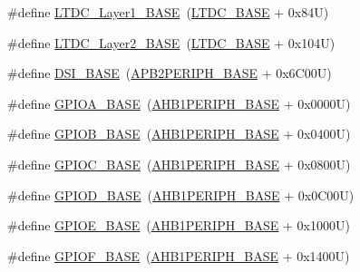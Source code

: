 \begin{DoxyCompactItemize}
\item 
\#define \hyperlink{group___peripheral__memory__map_ga81a2641d0a8e698f32b160b2d20d070b}{L\+T\+D\+C\+\_\+\+Layer1\+\_\+\+B\+A\+SE}~(\hyperlink{group___peripheral__memory__map_gac6e45c39fafa3e82cdedbf447b461704}{L\+T\+D\+C\+\_\+\+B\+A\+SE} + 0x84\+U)
\item 
\#define \hyperlink{group___peripheral__memory__map_ga696614b764a3820d9f9560a0eec1e111}{L\+T\+D\+C\+\_\+\+Layer2\+\_\+\+B\+A\+SE}~(\hyperlink{group___peripheral__memory__map_gac6e45c39fafa3e82cdedbf447b461704}{L\+T\+D\+C\+\_\+\+B\+A\+SE} + 0x104\+U)
\item 
\#define \hyperlink{group___peripheral__memory__map_gac094188b138a77bbac13d9361609b617}{D\+S\+I\+\_\+\+B\+A\+SE}~(\hyperlink{group___peripheral__memory__map_ga25b99d6065f1c8f751e78f43ade652cb}{A\+P\+B2\+P\+E\+R\+I\+P\+H\+\_\+\+B\+A\+SE} + 0x6\+C00\+U)
\item 
\#define \hyperlink{group___peripheral__memory__map_gad7723846cc5db8e43a44d78cf21f6efa}{G\+P\+I\+O\+A\+\_\+\+B\+A\+SE}~(\hyperlink{group___peripheral__memory__map_ga811a9a4ca17f0a50354a9169541d56c4}{A\+H\+B1\+P\+E\+R\+I\+P\+H\+\_\+\+B\+A\+SE} + 0x0000\+U)
\item 
\#define \hyperlink{group___peripheral__memory__map_gac944a89eb789000ece920c0f89cb6a68}{G\+P\+I\+O\+B\+\_\+\+B\+A\+SE}~(\hyperlink{group___peripheral__memory__map_ga811a9a4ca17f0a50354a9169541d56c4}{A\+H\+B1\+P\+E\+R\+I\+P\+H\+\_\+\+B\+A\+SE} + 0x0400\+U)
\item 
\#define \hyperlink{group___peripheral__memory__map_ga26f267dc35338eef219544c51f1e6b3f}{G\+P\+I\+O\+C\+\_\+\+B\+A\+SE}~(\hyperlink{group___peripheral__memory__map_ga811a9a4ca17f0a50354a9169541d56c4}{A\+H\+B1\+P\+E\+R\+I\+P\+H\+\_\+\+B\+A\+SE} + 0x0800\+U)
\item 
\#define \hyperlink{group___peripheral__memory__map_ga1a93ab27129f04064089616910c296ec}{G\+P\+I\+O\+D\+\_\+\+B\+A\+SE}~(\hyperlink{group___peripheral__memory__map_ga811a9a4ca17f0a50354a9169541d56c4}{A\+H\+B1\+P\+E\+R\+I\+P\+H\+\_\+\+B\+A\+SE} + 0x0\+C00\+U)
\item 
\#define \hyperlink{group___peripheral__memory__map_gab487b1983d936c4fee3e9e88b95aad9d}{G\+P\+I\+O\+E\+\_\+\+B\+A\+SE}~(\hyperlink{group___peripheral__memory__map_ga811a9a4ca17f0a50354a9169541d56c4}{A\+H\+B1\+P\+E\+R\+I\+P\+H\+\_\+\+B\+A\+SE} + 0x1000\+U)
\item 
\#define \hyperlink{group___peripheral__memory__map_ga7f9a3f4223a1a784af464a114978d26e}{G\+P\+I\+O\+F\+\_\+\+B\+A\+SE}~(\hyperlink{group___peripheral__memory__map_ga811a9a4ca17f0a50354a9169541d56c4}{A\+H\+B1\+P\+E\+R\+I\+P\+H\+\_\+\+B\+A\+SE} + 0x1400\+U)

\end{DoxyCompactItemize}

